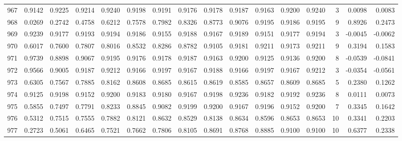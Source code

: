 \begin{tabular}{lrrrrrrrrrrrrrrr}
967 &      0.9142 &  0.9225 &  0.9214 &  0.9240 &  0.9198 &  0.9191 &  0.9176 &  0.9178 &  0.9187 &  0.9163 &   0.9200 &     0.9240 &      3 &                    0.0098 &                     0.0083 \\
968 &      0.0269 &  0.2742 &  0.4758 &  0.6212 &  0.7578 &  0.7982 &  0.8326 &  0.8773 &  0.9076 &  0.9195 &   0.9186 &     0.9195 &      9 &                    0.8926 &                     0.2473 \\
969 &      0.9239 &  0.9177 &  0.9193 &  0.9194 &  0.9186 &  0.9155 &  0.9188 &  0.9167 &  0.9189 &  0.9151 &   0.9177 &     0.9194 &      3 &                   -0.0045 &                    -0.0062 \\
970 &      0.6017 &  0.7600 &  0.7807 &  0.8016 &  0.8532 &  0.8286 &  0.8782 &  0.9105 &  0.9181 &  0.9211 &   0.9173 &     0.9211 &      9 &                    0.3194 &                     0.1583 \\
971 &      0.9739 &  0.8898 &  0.9067 &  0.9195 &  0.9176 &  0.9178 &  0.9187 &  0.9163 &  0.9200 &  0.9125 &   0.9136 &     0.9200 &      8 &                   -0.0539 &                    -0.0841 \\
972 &      0.9566 &  0.9005 &  0.9187 &  0.9212 &  0.9166 &  0.9197 &  0.9167 &  0.9188 &  0.9166 &  0.9197 &   0.9167 &     0.9212 &      3 &                   -0.0354 &                    -0.0561 \\
973 &      0.6305 &  0.7567 &  0.7885 &  0.8162 &  0.8608 &  0.8685 &  0.8615 &  0.8619 &  0.8585 &  0.8657 &   0.8609 &     0.8685 &      5 &                    0.2380 &                     0.1262 \\
974 &      0.9125 &  0.9198 &  0.9152 &  0.9200 &  0.9183 &  0.9180 &  0.9167 &  0.9198 &  0.9236 &  0.9182 &   0.9192 &     0.9236 &      8 &                    0.0111 &                     0.0073 \\
975 &      0.5855 &  0.7497 &  0.7791 &  0.8233 &  0.8845 &  0.9082 &  0.9199 &  0.9200 &  0.9167 &  0.9196 &   0.9152 &     0.9200 &      7 &                    0.3345 &                     0.1642 \\
976 &      0.5312 &  0.7515 &  0.7555 &  0.7882 &  0.8121 &  0.8632 &  0.8529 &  0.8138 &  0.8634 &  0.8596 &   0.8653 &     0.8653 &     10 &                    0.3341 &                     0.2203 \\
977 &      0.2723 &  0.5061 &  0.6465 &  0.7521 &  0.7662 &  0.7806 &  0.8105 &  0.8691 &  0.8768 &  0.8885 &   0.9100 &     0.9100 &     10 &                    0.6377 &                     0.2338 \\

\end{tabular}
